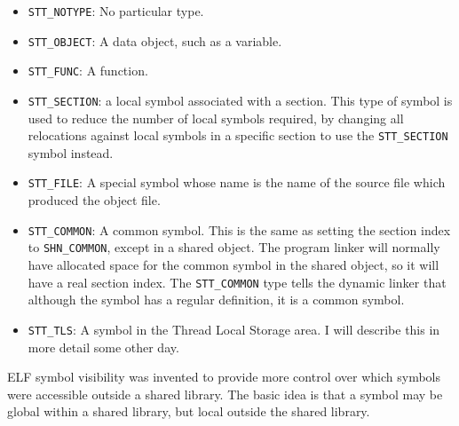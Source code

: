 \begin{itemize}
    \item \texttt{STT\_NOTYPE}: No particular type.

    \item \texttt{STT\_OBJECT}: A data object, such as a variable.

    \item \texttt{STT\_FUNC}: A function.

    \item \texttt{STT\_SECTION}: a local symbol associated with a section. This
          type of symbol is used to reduce the number of local symbols
          required, by changing all relocations against local symbols in a
          specific section to use the \texttt{STT\_SECTION} symbol instead.

    \item \texttt{STT\_FILE}: A special symbol whose name is the name of the
          source file which produced the object file.

    \item \texttt{STT\_COMMON}: A common symbol. This is the same as setting the
          section index to \texttt{SHN\_COMMON}, except in a shared object. The
          program linker will normally have allocated space for the common
          symbol in the shared object, so it will have a real section index.
          The \texttt{STT\_COMMON} type tells the dynamic linker that although the
          symbol has a regular definition, it is a common symbol.

    \item \texttt{STT\_TLS}: A symbol in the Thread Local Storage area. I will
          describe this in more detail some other day.
\end{itemize}

ELF symbol visibility was invented to provide more control over which symbols
were accessible outside a shared library. The basic idea is that a symbol may
be global within a shared library, but local outside the shared library.

